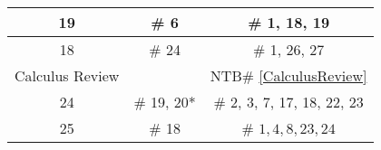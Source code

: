 \documentclass[12pt]{article}
\begin{document}
\begin{center}
\begin{tabular}{|c|c||c|}
19 & \# 6  & \# 1, 18, 19\\   %
\hline
18 & \# 24  & \# 1, 26, 27\\  %
\hline
Calculus Review &    & NTB\# \ref{CalculusReview} \\  
\hline
24 &  \# 19, 20*  & \# 2, 3, 7, 17, 18, 22, 23\\  

\hline


25 & \# 18  & \# $1, 4, 8, 23, 24$\\

\hline


\end{tabular}
\end{center}




\end{document}
